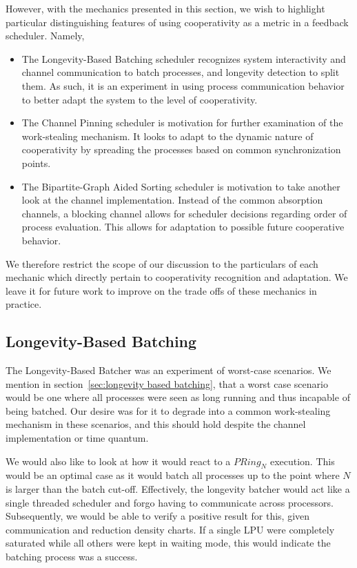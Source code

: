 However, with the mechanics presented in this section, we wish to highlight particular
distinguishing features of using cooperativity as a metric in a feedback scheduler. 
Namely,
\begin{itemize}
    \item The Longevity-Based Batching scheduler recognizes system interactivity
        and channel communication to batch processes, and longevity detection to
        split them. As such, it is an experiment in using process communication
        behavior to better adapt the system to the level of cooperativity.

    \item The Channel Pinning scheduler is motivation for further examination of
        the work-stealing mechanism. It looks to adapt to the dynamic nature of
        cooperativity by spreading the processes based on common synchronization 
        points.

    \item The Bipartite-Graph Aided Sorting scheduler is motivation to take 
        another look at the channel implementation. Instead of the common 
        absorption channels, a blocking channel allows for scheduler decisions 
        regarding order of process evaluation. This allows for adaptation 
        to possible future cooperative behavior.
\end{itemize}
We therefore restrict the scope of our discussion to the particulars of
each mechanic which directly pertain to cooperativity recognition and
adaptation. We leave it for future work to improve on the trade offs of these
mechanics in practice.

\subsection{Longevity-Based Batching}\label{sec:results-longbatcher}

The Longevity-Based Batcher was an experiment of worst-case scenarios. We
mention in section~\ref{sec:longevity based batching}, that a worst case 
scenario would be one where all processes were seen as long running and 
thus incapable of being batched. Our desire was for it to degrade into 
a common work-stealing mechanism in these scenarios, and this should hold despite 
the channel implementation or time quantum.

We would also like to look at how it would react to a $PRing_N$ execution. This
would be an optimal case as it would batch all processes up to the point where
$N$ is larger than the batch cut-off. Effectively, the longevity batcher would
act like a single threaded scheduler and forgo having to communicate across
processors. Subsequently, we would be able to verify a positive result for this, given
communication and reduction density charts. If a single LPU were completely
saturated while all others were kept in waiting mode, this would indicate the
batching process was a success.

